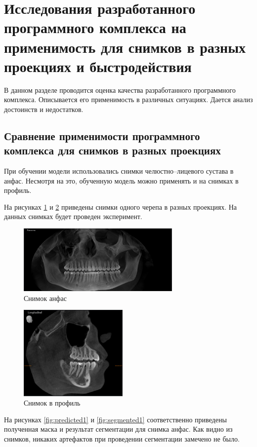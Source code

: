 \section{Исследования разработанного программного комплекса на применимость для снимков в разных проекциях и быстродействия}

В данном разделе проводится оценка качества разработанного программного комплекса. Описывается его применимость в различных ситуациях. Дается анализ достоинств и недостатков.

\subsection{Сравнение применимости программного комплекса для снимков в разных проекциях}

При обучении модели использовались снимки челюстно--лицевого сустава в анфас. Несмотря на это, обученную модель можно применять и на снимках в профиль.

На рисунках \ref{fig:anfas} и \ref{fig:profile} приведены снимки одного черепа в разных проекциях. На данных снимках будет проведен эксперимент.

\begin{figure}[H]
	\centering
	\includegraphics[width=300px]{img/anfas.jpeg}
	\caption{Снимок анфас}
	\label{fig:anfas}
\end{figure}

\begin{figure}[H]
	\centering
	\includegraphics[width=200px]{img/profile.jpeg}
	\caption{Снимок в профиль}
	\label{fig:profile}
\end{figure}

На рисунках \ref{fig:predicted1} и \ref{fig:segmented1} соответственно приведены полученная маска и результат сегментации для снимка анфас. Как видно из снимков, никаких артефактов при проведении сегментации замечено не было.

